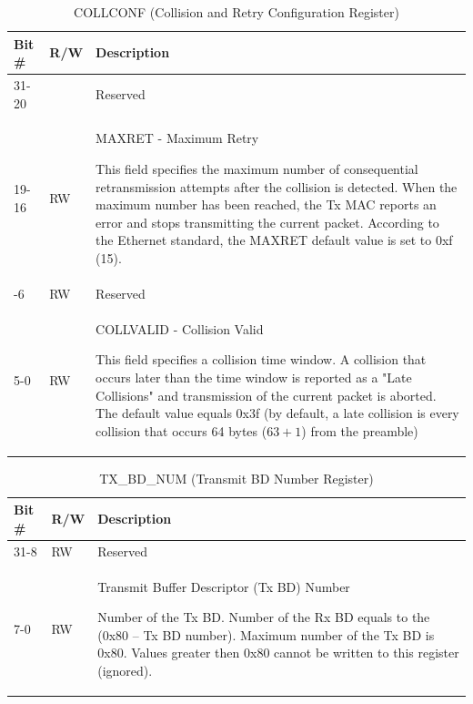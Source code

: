 \begin{xltabular}{\textwidth}{|l|l|X|}
  
  \hline
  {\bf Bit \#} & {\bf R/W} & {\bf Description} \\ \hline \hline
  \endfirsthead
  \hline
  \caption{COLLCONF (Collision and Retry Configuration Register)}
  \endlastfoot

  31-20   &   & Reserved \\* \nobreakhline
  19-16      & RW & MAXRET - Maximum Retry

              This field specifies the maximum number of consequential
              retransmission attempts after the collision is detected. When
              the maximum number has been reached, the Tx MAC reports an
              error and stops transmitting the current packet. According to
              the Ethernet standard, the MAXRET default value is set to 0xf
              (15).\\* -6      & RW &   Reserved \\* \nobreakhline
  5-0       & RW &   COLLVALID - Collision Valid 

              This field specifies a collision time window. A collision that
              occurs later than the time window is reported as a "Late
              Collisions" and transmission of the current packet is aborted.
              The default value equals 0x3f (by default, a late collision is
              every collision that occurs 64 bytes ($63 + 1$) from the
              preamble) \\ \hline
\end{xltabular}
\label{csr_details:collconf}

\begin{xltabular}{\textwidth}{|l|l|X|}
  
  \hline
  {\bf Bit \#} & {\bf R/W} & {\bf Description} \\ \hline \hline
  \endfirsthead
  \hline
  \caption{TX\_BD\_NUM (Transmit BD Number Register)}
  \endlastfoot

  31-8   & RW  & Reserved \\* \nobreakhline
    7-0   & RW  & Transmit Buffer Descriptor (Tx BD) Number

              Number of the Tx BD. Number of the Rx BD equals to the (0x80 –
              Tx BD number). Maximum number of the Tx BD is 0x80. Values
              greater then 0x80 cannot be written to this register
              (ignored).\\
\end{xltabular}
\label{csr_details:tx_bd_num}

